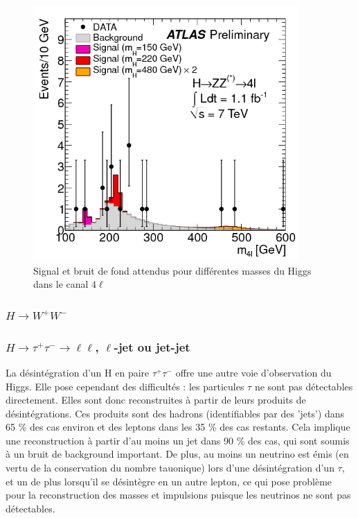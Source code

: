 \documentclass[11pt]{article} %
\begin{document}
\begin{figure}[H]
\centering
  \caption{Signal et bruit de fond attendus pour différentes masses du Higgs dans le canal $4\ell$}
 \includegraphics[width=0.9\textwidth]{../images/atlas_llll_events.png}
\end{figure}


\subsubsection{$H \to W^+W^-$}


\subsubsection{$H \to \tau^+\tau^- \to \ell\ell$, $\ell$-jet ou jet-jet}

La désintégration d'un H en paire $\tau^+ \tau^-$ offre une autre voie d'observation du Higgs. Elle pose cependant des difficultés : les particules $\tau$ ne sont pas détectables directement. Elles sont donc reconstruites à partir de leurs produits de désintégrations. Ces produits sont des hadrons (identifiables par des 'jets') dans 65 \% des cas environ et des leptons dans les 35 \% des cas restants. Cela implique une reconstruction à partir d'au moins un jet dans 90  \% des cas, qui sont soumis à un bruit de  background important. De plus, au moins un neutrino est émis (en vertu de la conservation du nombre tauonique) lors d'une désintégration d'un $\tau$, et un de plus lorsqu'il se désintègre en un autre lepton, ce qui pose problème pour la reconstruction des masses et impulsions puisque les neutrinos ne sont pas détectables.
\end{document}

